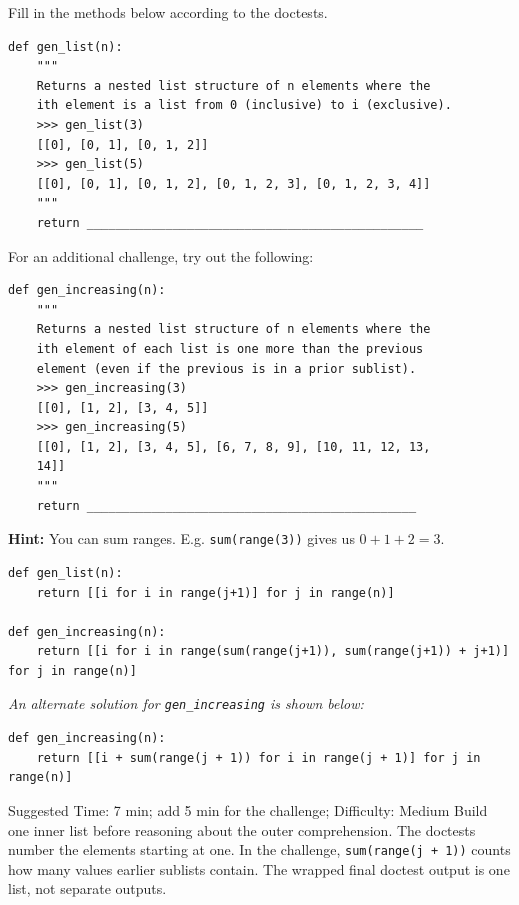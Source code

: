 \begin{blocksection}
\begin{blocksection}
\question Fill in the methods below according to the doctests.
\end{blocksection}

\begin{lstlisting}
def gen_list(n):
    """
    Returns a nested list structure of n elements where the 
    ith element is a list from 0 (inclusive) to i (exclusive).
    >>> gen_list(3)
    [[0], [0, 1], [0, 1, 2]]
    >>> gen_list(5)
    [[0], [0, 1], [0, 1, 2], [0, 1, 2, 3], [0, 1, 2, 3, 4]]
    """
    return _______________________________________________
\end{lstlisting}

For an additional challenge, try out the following:

\begin{lstlisting}
def gen_increasing(n):
    """
    Returns a nested list structure of n elements where the 
    ith element of each list is one more than the previous 
    element (even if the previous is in a prior sublist).
    >>> gen_increasing(3)
    [[0], [1, 2], [3, 4, 5]]
    >>> gen_increasing(5)
    [[0], [1, 2], [3, 4, 5], [6, 7, 8, 9], [10, 11, 12, 13, 
    14]]
    """
    return ______________________________________________
\end{lstlisting}

\textbf{Hint:} You can sum ranges. E.g. \texttt{sum(range(3))} gives us $0 + 1 + 2 = 3$.

\begin{solution}
\begin{lstlisting}
def gen_list(n):
    return [[i for i in range(j+1)] for j in range(n)]

def gen_increasing(n):
    return [[i for i in range(sum(range(j+1)), sum(range(j+1)) + j+1)] for j in range(n)]
\end{lstlisting}

\textit{An alternate solution for \texttt{gen\_increasing} is shown below:}

\begin{lstlisting}
def gen_increasing(n):
    return [[i + sum(range(j + 1)) for i in range(j + 1)] for j in range(n)]
\end{lstlisting}
\end{solution}
\end{blocksection}

\begin{questionmeta}
    Suggested Time: 7 min; add 5 min for the challenge; Difficulty: Medium
    Build one inner list before reasoning about the outer comprehension. The doctests number the elements starting at one. In the challenge, \lstinline{sum(range(j + 1))} counts how many values earlier sublists contain. The wrapped final doctest output is one list, not separate outputs.
\end{questionmeta}
